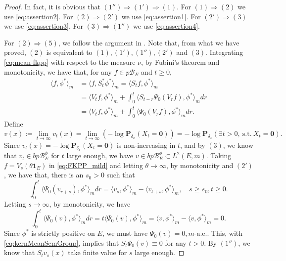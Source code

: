 \begin{proof}
	In fact, it is obvious that $(1'')\Rightarrow (1')\Rightarrow (1)$.
	For $(1)\Rightarrow (2)$ we use \eqref{eq:assertion2}.
	For $(2)\Rightarrow (2')$ we use \eqref{eq:assertion1}.
	For $(2')\Rightarrow (3)$ we use \eqref{eq:assertion3}.
	For $(3)\Rightarrow (1'')$ we use \eqref{eq:assertion4}.
\par
	For $(2)\Rightarrow (5)$, we follow the argument in \cite[Lemma 3.3]{RenSongZhang2015Limit}.
	Note that, from what we have proved, $(2)$ is equivalent to $(1),(1'),(1''),(2')$ and $(3)$.
	Integrating \eqref{eq:mean-fkpp} with respect to the measure $\nu$,
	by Fubini's theorem and monotonicity, we have that, for any $f\in p\mathscr B_E$ and $t\geq 0$,
\begin{equation}\label{eq:FKPP_mild}\begin{split}
	\langle f,\phi^*\rangle_m
	&=\langle f,S_t^*\phi^*\rangle_m
	=\langle S_tf,\phi^*\rangle_m\\
	&=\langle V_tf,\phi^*\rangle_m + \int_0^t\langle S_{t-r}\Psi_0(V_rf),\phi^*\rangle_m dr\\
	&=\langle V_tf,\phi^*\rangle_m + \int_0^t \langle \Psi_0(V_rf),\phi^*\rangle_mdr.
\end{split}\end{equation}
	Define
\[
 	v(x)
 	:= \lim_{t\to\infty} v_t(x)
 	= \lim_{t\to\infty}(-\log\mathbf P_{\delta_x}(X_t=\mathbf 0))
 	= -\log \mathbf P_{\delta_x}(\exists t>0, ~\text{s.t.}~ X_t=\mathbf 0).
 \]
	Since $v_t(x)=-\log\mathbf P_{\delta_x}(X_t=\mathbf 0)$ is non-increasing in $t$, and by $(3)$, we know that $v_t\in bp\mathscr B^\phi_E$ for $t$ large enough, we have $v\in bp\mathscr B^\phi_E\subset L^2(E,m)$.
	Taking $f=V_s(\theta \mathbf 1_E)$ in \eqref{eq:FKPP_mild} and letting $\theta\to\infty$, by monotonicity and $(2')$, we have that, there is an $s_0>0$ such that
\begin{equation}\label{eq:extinction-vt-phi}
	\int_0^t \langle \Psi_0(v_{r+s}),\phi^*\rangle_mdr
	=\langle v_s,\phi^*\rangle_m-\langle v_{t+s},\phi^*\rangle_m,
	\quad s\geq s_0, t\geq 0.
\end{equation}
	Letting $s\to\infty$, by monotonicity, we have
\[
	\int_0^t \langle \Psi_0(v), \phi^* \rangle_m dr
	= t \langle \Psi_0(v), \phi^* \rangle_m
	= \langle v, \phi^* \rangle_m - \langle v, \phi^* \rangle_m
	= 0.
\]
	Since $\phi^*$ is strictly positive on $E$, we must have $\Psi_0(v) = 0, m\text{-a.e.}$.
	This, with \eqref{eq:kernMeanSemGroup}, implies that $S_t\Psi_0 (v)\equiv 0$ for any $t>0$.
	By $(1'')$, we know that $S_t v_s(x)$ take finite value for $s$ large enough.

\end{proof}
